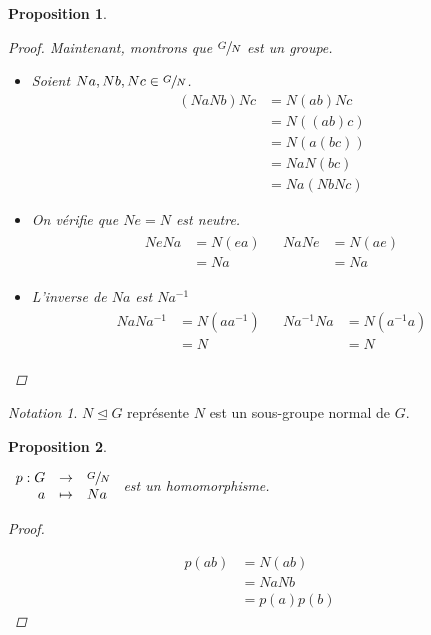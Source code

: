 \documentclass{report}
\newtheorem*{prop}{Proposition}
\theoremstyle{definition}
\theoremstyle{remark}
\newtheorem*{nota}{Notation}
\begin{document}
\begin{prop}
\begin{proof}
			Maintenant, montrons que $\sfrac{G}{N}$ est un groupe.
			\begin{itemize}
				\item[(A)] Soient $Na, Nb, Nc \in \sfrac{G}{N}$.
				\begin{align*}
					(NaNb)Nc&= N(ab)Nc\\
					&= N((ab)c)\\
					&= N(a(bc))\\
					&= NaN(bc)\\
					&= Na(NbNc)
				\end{align*}
				\item[(N)] On v\'erifie que $Ne=N$ est neutre.
				\begin{align*}
					\begin{split}
						NeNa&= N(ea)\\
						&= Na
					\end{split}
					&
					\begin{split}
						NaNe&= N(ae)\\
						&= Na
					\end{split}
				\end{align*}
				\item[(I)] L'inverse de $Na$ est $Na^{-1}$
				\begin{align*}
					\begin{split}
						NaNa^{-1}&= N(aa^{-1})\\
						&= N
					\end{split}
					&
					\begin{split}
						Na^{-1}Na&= N(a^{-1}a)\\
						&= N
					\end{split}
				\end{align*}
			\end{itemize}
		\end{proof}
	\end{prop}
	\begin{nota}
		$N \trianglelefteq G$ repr\'esente $N$ est un sous-groupe normal de $G$.
	\end{nota}
	\begin{prop}~

		$\begin{array}{rcl}
			p:G&\to&\sfrac{G}{N}\\
			a&\mapsto&Na
		\end{array}$ est un homomorphisme.
		\begin{proof}~

			\begin{align*}
				p(ab)&= N(ab)\\
				&= NaNb\\
				&= p(a)p(b)
			\end{align*}
		\end{proof}
	\end{prop}
\end{document}
